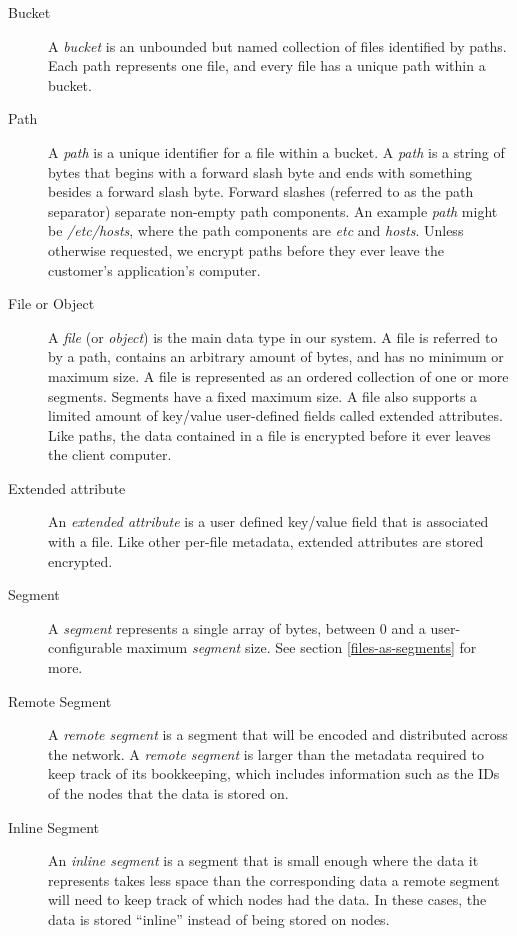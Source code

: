 \documentclass[8pt,fleqn,openany]{book}
\newcommand{\code}[1]{{\em #1}}
\begin{document}
\begin{description}
\item[Bucket] A {\em bucket} is an unbounded but named collection of files
identified by paths.
Each path represents one file, and every file has a unique path within a bucket.

\item[Path] A {\em path} is a unique identifier for a file within a
bucket. A {\em path} is a string of bytes that begins with a forward
slash byte and ends with something besides a forward slash byte. Forward
slashes (referred to as the path separator) separate non-empty path components.
An example {\em path} might be \code{/etc/hosts}, where the path components are
\code{etc} and \code{hosts}.
Unless otherwise requested,
we encrypt paths before they ever leave the customer's application's
computer.

\item[File or Object] A {\em file} (or {\em object}) is the main data type in
our system. A file is referred to by a path, contains an arbitrary amount of
bytes, and has no minimum or maximum size. A file is represented as an ordered
collection of one or more segments. Segments have a fixed maximum size.
A file also supports a limited amount of key/value user-defined fields
called extended attributes.
Like paths, the data contained in a file is encrypted before it ever
leaves the client computer.

\item[Extended attribute] An {\em extended attribute} is a user defined key/value
field that is associated with a file. Like other per-file metadata,
extended attributes are stored encrypted.

\item[Segment] A {\em segment} represents a single array of bytes, between 0 and a
user-configurable maximum {\em segment} size.
See section \ref{files-as-segments} for more.

\item[Remote Segment] A {\em remote segment} is a segment that will be
encoded and distributed across the network. A {\em remote segment} is larger than
the metadata required to keep track of its bookkeeping, which includes
information such as the IDs of the nodes that the data is stored on.

\item[Inline Segment] An {\em inline segment} is a segment that is small
enough where the data it represents takes less space than the corresponding
data a remote segment will need to keep track of which nodes had the data.
In these cases, the data is stored ``inline'' instead of being stored on nodes.


\end{description}
\end{document}
